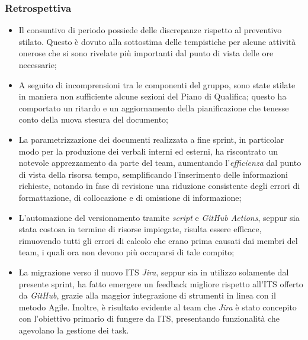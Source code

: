 \documentclass[10pt, a4paper]{article}
\begin{document}
\subsubsection{Retrospettiva}
\begin{itemize}
\item Il consuntivo di periodo possiede delle discrepanze rispetto al preventivo stilato. Questo è dovuto alla sottostima delle 
tempistiche per alcune attività onerose che si sono rivelate più importanti dal punto di vista delle ore necessarie;
\item A seguito di incomprensioni tra le componenti del gruppo, sono state stilate in maniera non sufficiente alcune sezioni del 
Piano di Qualifica; questo ha comportato un ritardo e un aggiornamento della pianificazione che tenesse conto della nuova stesura del documento;
\item La parametrizzazione dei documenti realizzata a fine sprint, in particolar modo per la produzione dei verbali interni ed esterni, ha riscontrato un notevole apprezzamento
da parte del team, aumentando l'\textit{efficienza\pg} dal punto di vista della risorsa tempo, semplificando l'inserimento delle informazioni richieste, notando
in fase di revisione una riduzione consistente degli errori di formattazione, di collocazione e di omissione di informazione;
\item L'automazione del versionamento tramite \textit{script\pg} e \textit{GitHub Actions\pg}, seppur sia stata costosa in termine di risorse impiegate,
risulta essere efficace, rimuovendo tutti gli errori di calcolo che erano prima causati dai membri del team, i quali ora non devono più occuparsi di tale compito;
\item La migrazione verso il nuovo ITS \textit{Jira}, seppur sia in utilizzo solamente dal presente sprint, ha fatto emergere un feedback migliore rispetto all'ITS 
offerto da \textit{GitHub}, grazie alla maggior integrazione di strumenti in linea con il metodo Agile. Inoltre, è risultato evidente al team che \textit{Jira} è stato concepito 
con l'obiettivo primario di fungere da ITS, presentando funzionalità che agevolano la gestione dei task.
\end{itemize}
\end{document}
